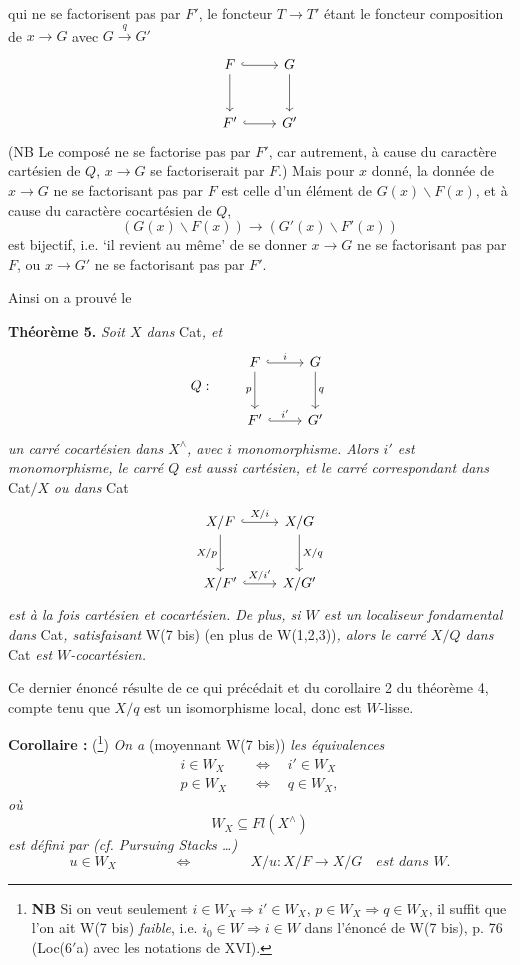 \documentclass[11pt]{article}
\newcommand{\printedpage}[1]{\marginpar{\footnotesize p.~#1}}
\newcommand{\msp}[1]{\marginpar{\footnotesize [#1]}}
\begin{document}
\printedpage{113}
qui ne se factorisent pas par $F'$, le foncteur $T \longrightarrow T'$ étant le foncteur composition de $x \longrightarrow G$ avec $G \xrightarrow{q} G'$
\[
\begin{tikzcd}[row sep=large]
F \arrow[r, hook] \arrow[d] & G \arrow[d] \\
F' \arrow[r, hook] & G'
\end{tikzcd}
\]
(NB Le composé ne se factorise pas par $F'$, car autrement, à cause du caractère cartésien de $Q$, $x \longrightarrow G$ se factoriserait par $F$.) Mais pour $x$ donné, la donnée de $x \longrightarrow G$ ne se factorisant pas par $F$ est celle d’un élément \msp{page 167} de $G(x)\backslash F(x)$, et à cause du caractère cocartésien de $Q$,
\[
(G(x)\backslash F(x)) \longrightarrow (G'(x)\backslash F'(x))
\]
est bijectif, i.e. ‘il revient au même’ de se donner $x \longrightarrow G$ ne se factorisant pas par $F$, ou $x \longrightarrow G'$ ne se factorisant pas par $F'$.

Ainsi on a prouvé le

\textbf{Théorème 5.} \textit{Soit $X$ dans} Cat\textit{, et}
\[
Q : \qquad
\begin{tikzcd}[row sep=large, baseline=(current bounding box.center)]
F \arrow[r, hook, "i"] \arrow[d, "p"'] & G \arrow[d, "q"] \\
F' \arrow[r, hook, "i'"] & G'
\end{tikzcd}
\]
\textit{un carré cocartésien dans $X^\wedge$, avec $i$} \textit{monomorphisme. Alors $i'$ est} \textit{monomorphisme, le carré $Q$ est aussi cartésien, et le carré correspondant dans} Cat$/X$ \textit{ou dans} Cat
\[
\begin{tikzcd}[row sep=large]
X/F \arrow[r, hook, "X/i"] \arrow[d, "X/p"'] & X/G \arrow[d, "X/q"] \\
X/F' \arrow[r, hook, "X/i'"] & X/G'
\end{tikzcd}
\]
\msp{page 168} \textit{est à la fois cartésien et cocartésien. De plus, si $W$ est un localiseur fondamental dans} Cat\textit{, satisfaisant} W(7 bis) (en plus de W(1,2,3))\textit{, alors le carré $X/Q$ dans} Cat \textit{est $W$-cocartésien.}

\printedpage{114}
Ce dernier énoncé résulte de ce qui précédait et du corollaire 2 du théorème 4, compte tenu que $X/q$ est un isomorphisme local, donc est $W$-lisse.

\textbf{Corollaire :} (\footnote[111]{\textbf{NB} Si on veut seulement $i \in W_X \Longrightarrow i' \in W_X$, $p \in W_X \Longrightarrow q \in W_X$, il suffit que l’on ait W(7 bis) \textit{faible}, i.e. $i_0 \in W \Longrightarrow i \in W$ dans l’énoncé de W(7 bis), p. 76 (Loc(6$'$a) avec les notations de XVI).}) \textit{On a} (moyennant W(7 bis)) \textit{les équivalences}
\[
\begin{aligned}
i \in W_X \quad &\Longleftrightarrow \quad i' \in W_X \\
p \in W_X \quad &\Longleftrightarrow \quad q \in W_X,
\end{aligned}
\]
\textit{où}
\[
W_X \subseteq \mathit{Fl}(X^\wedge)
\]
\textit{est défini par (cf. Pursuing Stacks \ldots)}
\[
u \in W_X \qquad\qquad \Longleftrightarrow \qquad\qquad X/u : X/F \longrightarrow X/G \quad \textit{est dans } W.
\]
\end{document}

